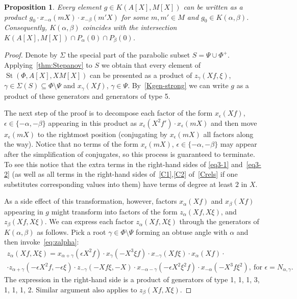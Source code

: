 \documentclass[oneside, 8pt]{amsart}
\newtheorem{prop}{Proposition}
\theoremstyle{remark}
\theoremstyle{definition}
\DeclareMathOperator{\St}{St}
\numberwithin{equation}{section}
\begin{document}
\begin{prop} \label{K-a-b}
 Every element $g \in K(A[X], M[X])$ can be written as a product $g_0 \cdot x_{-\alpha}(mX) \cdot x_{-\beta}(m'X)$ for some $m, m' \in M$ and $g_0 \in K(\alpha, \beta)$. Consequently, $K(\alpha, \beta)$ coincides with the intersection $K(A[X], M[X]) \cap P_\alpha(0) \cap P_\beta(0)$.
\end{prop}
\begin{proof}
 Denote by $\Sigma$ the special part of the parabolic subset $S = \Psi \cup \Phi^+$.
 Applying~\cref{thm:Stepanov} to $S$ we obtain that every element of $\St(\Phi, A[X], XM[X])$ can be presented as a product of 
  $z_\gamma(Xf, \xi)$, $\gamma \in \Sigma(S) \subseteq \Phi\setminus \Psi$ and $x_\gamma(Xf)$, $\gamma \in \Psi$.
 By~\cref{Kgen-strong} we can write $g$ as a product of these generators and generators of type 5.
  
 The next step of the proof is to decompose each factor of the form $x_{\epsilon}(Xf)$, $\epsilon \in \{-\alpha,-\beta\}$ appearing in this product as
 $x_{\epsilon}(X^2f') \cdot x_{\epsilon}(mX)$ and then move $x_{\epsilon}(mX)$ to the rightmost position
  (conjugating by $x_{\epsilon}(mX)$ all factors along the way).
 Notice that no terms of the form $x_{\epsilon}(mX)$, $\epsilon \in \{ -\alpha, -\beta \}$ may appear after the simplification of conjugates,
  so this process is guaranteed to terminate.
 To see this notice that the extra terms in the right-hand sides of \eqref{eq3-1} and~\eqref{eq3-2} 
 (as well as all terms in the right-hand sides of~\eqref{C1},\eqref{C2} of~\cref{Crels} if one substitutes corresponding values into them)
  have terms of degree at least $2$ in $X$. 
  
 As a side effect of this transformation, however, factors $x_\alpha(Xf)$ and $x_\beta(Xf)$ appearing in $g$ might transform into factors of the form $z_\alpha(Xf, X\xi)$, and $z_\beta(Xf, X\xi)$. We can express each factor $z_\alpha(Xf, X\xi)$ through the generators of $K(\alpha, \beta)$ as follows. Pick a root $\gamma \in \Phi\setminus \Psi$ forming an obtuse angle with $\alpha$ and then invoke~\eqref{eq:zalpha}:
 \begin{multline}
  z_\alpha(Xf, X\xi) = x_{\alpha+\gamma}(\epsilon X^2f) \cdot x_{\gamma}(-X^3 \xi f) \cdot x_{-\gamma}(Xf\xi) \cdot x_\alpha(Xf) \cdot \\ \cdot z_{\alpha+\gamma}(-\epsilon X^2 f, -\epsilon \xi) \cdot z_{-\gamma}(-Xf\xi, -X) \cdot x_{-\alpha-\gamma}(-\epsilon X^2\xi^2 f) \cdot x_{-\alpha}(-X^3 f \xi^2),\ \text{for } \epsilon = N_{\alpha, \gamma}.
 \end{multline}
 The expression in the right-hand side is a product of generators of type 1, 1, 1, 3, 1, 1, 1, 2. Similar argument also applies to $z_\beta(Xf, X\xi)$.  
 

\end{proof}
\end{document}
